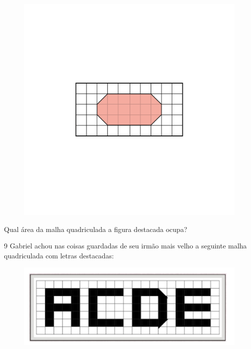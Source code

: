 \begin{figure}[htpb!]
\includegraphics[width=\textwidth]{../ilustracoes/MAT5/SAEB_5ANO_MAT_figura43.png}
\end{figure}

Qual área da malha quadriculada a figura destacada ocupa?



\num{9} Gabriel achou nas coisas guardadas de seu irmão mais velho a
seguinte malha quadriculada com letras destacadas:

\begin{figure}[htpb!]
\includegraphics[width=.5\textwidth]{./imgs/mat7.png}
\end{figure}


